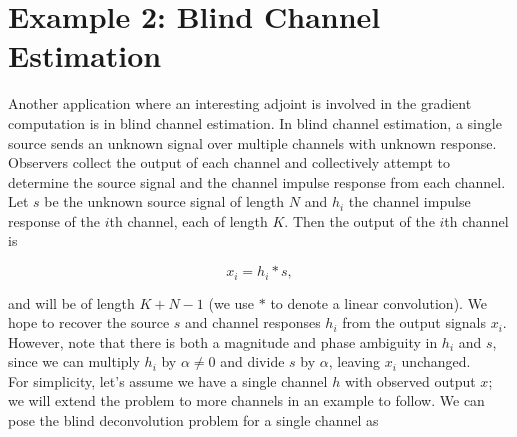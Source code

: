 \documentclass[journal]{IEEEtran}
\begin{document}
%
%


\section{Example 2: Blind Channel Estimation}

Another application where an interesting adjoint is involved in the gradient computation is in blind channel estimation.  In blind channel estimation, a single source sends an unknown signal over multiple channels with unknown response.  Observers collect the output of each channel and collectively attempt to determine the source signal and the channel impulse response from each channel.  Let $s$ be the unknown source signal of length $N$ and $h_i$ the channel impulse response of the $i$th channel, each of length $K$.  Then the output of the $i$th channel is

\[ x_i = h_i\ast s, \] 

\noindent and will be of length $K+N-1$ (we use $\ast$ to denote a linear convolution).  We hope to recover the source $s$ and channel responses $h_i$ from the output signals $x_i$.   However, note that there is both a magnitude and phase ambiguity in $h_i$ and $s$, since we can multiply $h_i$ by $\alpha\neq 0$ and divide $s$ by $\alpha$, leaving $x_i$ unchanged.\\

For simplicity, let's assume we have a single channel $h$ with observed output $x$; we will extend the problem to more channels in an example to follow.  We can pose the blind deconvolution problem for a single channel as
\end{document}
